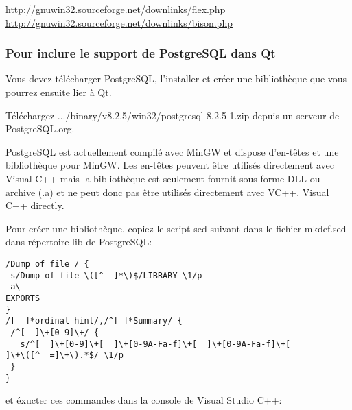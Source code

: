 \url{http://gnuwin32.sourceforge.net/downlinks/flex.php} \\
\url{http://gnuwin32.sourceforge.net/downlinks/bison.php}

% 
% 
% 

\subsubsection{Pour inclure le support de PostgreSQL dans Qt}
Vous devez t\'el\'echarger PostgreSQL, l'installer et cr\'eer une biblioth\`eque que vous pourrez ensuite lier \`a Qt.

T\'el\'echargez  .../binary/v8.2.5/win32/postgresql-8.2.5-1.zip depuis un serveur de PostgreSQL.org.

PostgreSQL est actuellement compil\'e avec MinGW et dispose d'en-t\^etes et une biblioth\`eque pour MinGW.   Les en-t\^etes peuvent \^etre utilis\'es directement avec Visual C++ mais la biblioth\`eque est seulement fournit sous forme DLL ou archive (.a) et ne peut donc pas \^etre utilis\'es directement avec VC++.
Visual C++ directly.

Pour cr\'eer une biblioth\`eque, copiez le script sed suivant dans le fichier mkdef.sed dans r\'epertoire lib de PostgreSQL:

\begin{verbatim}
/Dump of file / {
 s/Dump of file \([^  ]*\)$/LIBRARY \1/p
 a\
EXPORTS
}
/[  ]*ordinal hint/,/^[ ]*Summary/ {
 /^[  ]\+[0-9]\+/ {
   s/^[  ]\+[0-9]\+[  ]\+[0-9A-Fa-f]\+[  ]\+[0-9A-Fa-f]\+[ 
]\+\([^  =]\+\).*$/ \1/p
 }
}
\end{verbatim}

et \'exucter ces commandes dans la console de Visual Studio C++:

